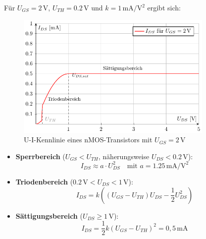 \documentclass[oneside]{scrarticle}
\numberwithin{equation}{section}
\begin{document}
Für \( U_{GS} = 2\,\mathrm{V} \), \( U_{TH} = 0.2\,\mathrm{V} \) und \( k = 1\,\mathrm{mA/V^2} \) ergibt sich:
\begin{figure}[h]
	\centering
	\label{fig:kennlinie}
	\includegraphics[width=0.85\textwidth]{tkiz/ui-kennlinie.pdf}
	\caption{U-I-Kennlinie eines nMOS-Transistors mit $U_{GS} = 2\,\mathrm{V}$}
\end{figure}
\begin{itemize}
	\item \textbf{Sperrbereich} ($U_{GS} < U_{TH}$, näherungsweise $U_{DS} < 0.2\,\mathrm{V}$): \\
	\[
	I_{DS} \approx a \cdot U_{DS}^2 \quad \text{mit } a = 1.25\,\mathrm{mA/V^2}
	\]
	\item \textbf{Triodenbereich} ($0.2\,\mathrm{V} < U_{DS} < 1\,\mathrm{V}$): \\
	\[
	I_{DS} = k \left((U_{GS} - U_{TH}) U_{DS} - \frac{1}{2} U_{DS}^2\right)
	\]
	\item \textbf{Sättigungsbereich} ($U_{DS} \ge 1\,\mathrm{V}$): \\
	\[
	I_{DS} = \frac{1}{2} k (U_{GS} - U_{TH})^2 = 0{,}5\,\mathrm{mA}
	\]
\end{itemize}
\end{document}
